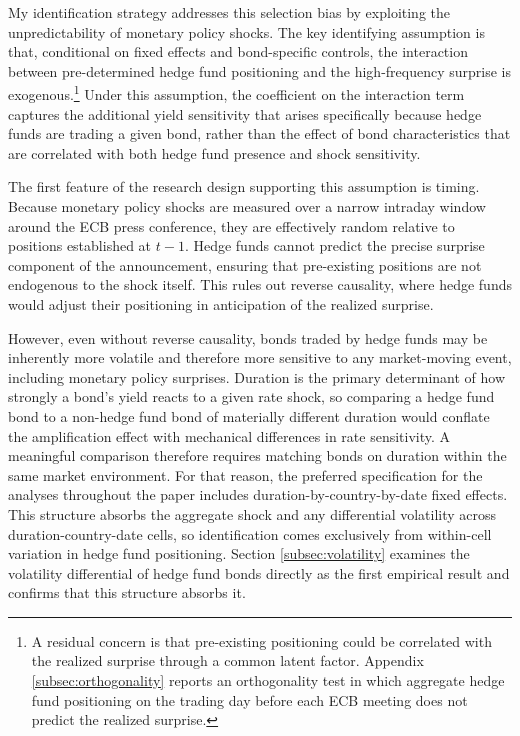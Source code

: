 \documentclass[english, 11pt, oneside]{article}
\begin{document}
My identification strategy addresses this selection bias by exploiting the unpredictability of monetary policy shocks. The key identifying assumption is that, conditional on fixed effects and bond-specific controls, the interaction between pre-determined hedge fund positioning and the high-frequency surprise is exogenous.\footnote{A residual concern is that pre-existing positioning could be correlated with the realized surprise through a common latent factor. Appendix \ref{subsec:orthogonality} reports an orthogonality test in which aggregate hedge fund positioning on the trading day before each ECB meeting does not predict the realized surprise.} Under this assumption, the coefficient on the interaction term captures the additional yield sensitivity that arises specifically because hedge funds are trading a given bond, rather than the effect of bond characteristics that are correlated with both hedge fund presence and shock sensitivity.

The first feature of the research design supporting this assumption is timing. Because monetary policy shocks are measured over a narrow intraday window around the ECB press conference, they are effectively random relative to positions established at $t{-}1$. Hedge funds cannot predict the precise surprise component of the announcement, ensuring that pre-existing positions are not endogenous to the shock itself. This rules out reverse causality, where hedge funds would adjust their positioning in anticipation of the realized surprise.

However, even without reverse causality, bonds traded by hedge funds may be inherently more volatile and therefore more sensitive to any market-moving event, including monetary policy surprises. Duration is the primary determinant of how strongly a bond's yield reacts to a given rate shock, so comparing a hedge fund bond to a non-hedge fund bond of materially different duration would conflate the amplification effect with mechanical differences in rate sensitivity. A meaningful comparison therefore requires matching bonds on duration within the same market environment.
For that reason, the preferred specification for the analyses throughout the paper includes duration-by-country-by-date fixed effects. This structure absorbs the aggregate shock and any differential volatility across duration-country-date cells, so identification comes exclusively from within-cell variation in hedge fund positioning. Section \ref{subsec:volatility} examines the volatility differential of hedge fund bonds directly as the first empirical result and confirms that this structure absorbs it.
\end{document}
